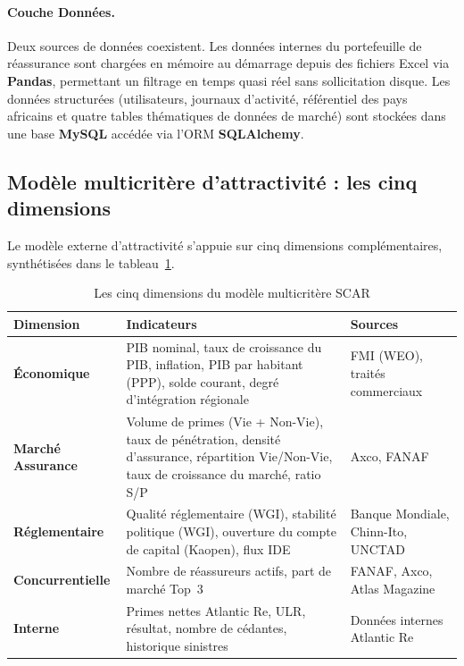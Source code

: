 \documentclass[../main.tex]{subfiles}
\begin{document}
\paragraph{Couche Données.} Deux sources de données coexistent. Les données internes du portefeuille de réassurance sont chargées en mémoire au démarrage depuis des fichiers Excel via \textbf{Pandas}, permettant un filtrage en temps quasi réel sans sollicitation disque. Les données structurées (utilisateurs, journaux d'activité, référentiel des pays africains et quatre tables thématiques de données de marché) sont stockées dans une base \textbf{MySQL} accédée via l'ORM \textbf{SQLAlchemy}.

\subsection{Modèle multicritère d'attractivité : les cinq dimensions}

Le modèle externe d'attractivité s'appuie sur cinq dimensions complémentaires, synthétisées dans le tableau~\ref{tab:dimensions_scar}.

\begin{table}[H]
\centering
\caption{Les cinq dimensions du modèle multicritère SCAR}
\label{tab:dimensions_scar}
\small
\begin{tabularx}{\textwidth}{@{}p{2.8cm}Xp{3cm}@{}}
\toprule
\textbf{Dimension} & \textbf{Indicateurs} & \textbf{Sources} \\
\midrule
\textbf{Économique} & PIB nominal, taux de croissance du PIB, inflation, PIB par habitant (PPP), solde courant, degré d'intégration régionale & FMI (WEO), traités commerciaux \\
\midrule
\textbf{Marché Assurance} & Volume de primes (Vie + Non-Vie), taux de pénétration, densité d'assurance, répartition Vie/Non-Vie, taux de croissance du marché, ratio S/P & Axco, FANAF \\
\midrule
\textbf{Réglementaire} & Qualité réglementaire (WGI), stabilité politique (WGI), ouverture du compte de capital (Kaopen), flux IDE & Banque Mondiale, Chinn-Ito, UNCTAD \\
\midrule
\textbf{Concurrentielle} & Nombre de réassureurs actifs, part de marché Top~3 & FANAF, Axco, Atlas Magazine \\
\midrule
\textbf{Interne} & Primes nettes Atlantic Re, ULR, résultat, nombre de cédantes, historique sinistres & Données internes Atlantic Re \\
\bottomrule
\end{tabularx}
\end{table}
\end{document}
